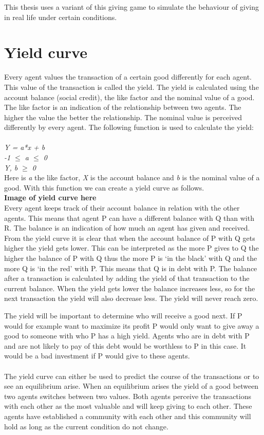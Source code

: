 \documentclass[twoside,openright]{uva-bachelor-thesis}
\begin{document}
This thesis uses a variant of this giving game to simulate the behaviour of giving in real life under certain conditions.

\section{Yield curve}
Every agent values the transaction of a certain good differently for each agent. This value of the transaction is called the yield. The yield is calculated using the account balance (social credit), the like factor and the nominal value of a good. The like factor is an indication of the relationship between two agents. The higher the value the better the relationship. The nominal value is perceived differently by every agent.
The following function is used to calculate the yield:
\\
\\
\textit{Y = a*x + b} \\
\textit{-1 $\le$ a $\le$ 0} \\
\textit{Y, b $\ge$ 0} \\
Here is \textit{a} the like factor, \textit{X} is the account balance and \textit{b} is the nominal value of a good. With this function we can create a yield curve as follows.
\\
\textbf{Image of yield curve here}
\\
Every agent keeps track of their account balance in relation with the other agents. This means that agent P can have a different balance with Q than with R. The balance is an indication of how much an agent has given and received. From the yield curve it is clear that when the account balance of P with Q gets higher the yield gets lower. This can be interpreted as the more P gives to Q the higher the balance of P with Q thus the more P is ‘in the black’ with Q and the more Q is ‘in the red’ with P. This means that Q is in debt with P. The balance after a transaction is calculated by adding the yield of that transaction to the current balance. When the yield gets lower the balance increases less, so for the next transaction the yield will also decrease less. The yield will never reach zero.

The yield will be important to determine who will receive a good next. If P would for example want to maximize its profit P would only want to give away a good to someone with who P has a high yield. Agents who are in debt with P and are not likely to pay of this debt would be worthless to P in this case. It would be a bad investment if P would give to these agents.
\\
\\
The yield curve can either be used to predict the course of the transactions or to see an equilibrium arise. When an equilibrium arises the yield of a good between two agents switches between two values.  Both agents perceive the transactions with each other as the most valuable and will keep giving to each other. These agents have established a community with each other and this community will hold as long as the current condition do not change. 
\end{document}
